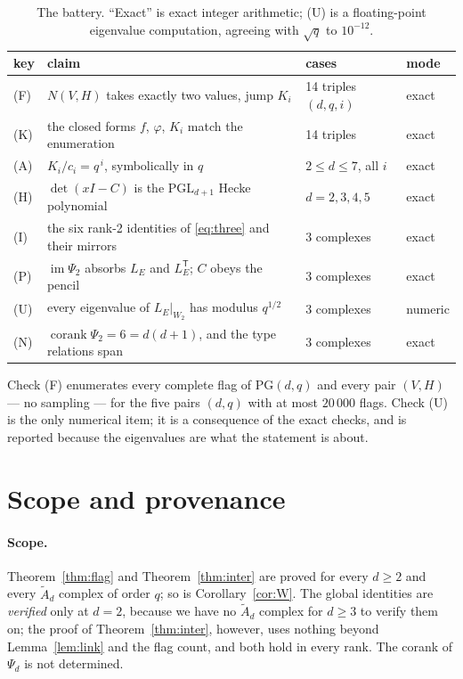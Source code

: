 \documentclass[11pt]{amsart}
\theoremstyle{plain}
\theoremstyle{definition}
\theoremstyle{remark}
\newcommand{\LE}{L_E}
\newcommand{\PG}{\mathrm{PG}}
\newcommand{\Atilde}[1]{\widetilde A_{#1}}
\newcommand{\im}{\operatorname{im}}
\newcommand{\tp}{\mathsf{T}}
\begin{document}
\begin{table}[h]
\centering
\begin{tabular}{llll}
\toprule
key & claim & cases & mode\\
\midrule
(F) & $N(V,H)$ takes exactly two values, jump $K_i$ & 14 triples $(d,q,i)$ & exact\\
(K) & the closed forms $f$, $\varphi$, $K_i$ match the enumeration & 14 triples & exact\\
(A) & $K_i/c_i=q^{\,i}$, symbolically in $q$ & $2\le d\le7$, all $i$ & exact\\
(H) & $\det(xI-C)$ is the $\mathrm{PGL}_{d+1}$ Hecke polynomial & $d=2,3,4,5$ & exact\\
(I) & the six rank-2 identities of \eqref{eq:three} and their mirrors & 3 complexes & exact\\
(P) & $\im\Psi_2$ absorbs $\LE$ and $\LE^{\tp}$; $C$ obeys the pencil & 3 complexes & exact\\
(U) & every eigenvalue of $\LE|_{W_2}$ has modulus $q^{1/2}$ & 3 complexes & numeric\\
(N) & $\operatorname{corank}\Psi_2=6=d(d+1)$, and the type relations span & 3 complexes & exact\\
\bottomrule
\end{tabular}
\caption{The battery. ``Exact'' is exact integer arithmetic; (U) is a floating-point
eigenvalue computation, agreeing with $\sqrt q$ to $10^{-12}$.}
\label{tab:battery}
\end{table}

Check (F) enumerates every complete flag of $\PG(d,q)$ and every pair $(V,H)$ --- no sampling
--- for the five pairs $(d,q)$ with at most $20\,000$ flags. Check (U) is the only numerical
item; it is a consequence of the exact checks, and is reported because the eigenvalues are
what the statement is about.

\section{Scope and provenance}

\paragraph{Scope.} Theorem~\ref{thm:flag} and Theorem~\ref{thm:inter} are proved for every
$d\ge2$ and every $\Atilde d$ complex of order $q$; so is Corollary~\ref{cor:W}. The global
identities are \emph{verified} only at $d=2$, because we have no $\Atilde d$ complex for
$d\ge3$ to verify them on; the proof of Theorem~\ref{thm:inter}, however, uses nothing beyond
Lemma~\ref{lem:link} and the flag count, and both hold in every rank. The corank of $\Psi_d$
is not determined.
\end{document}
